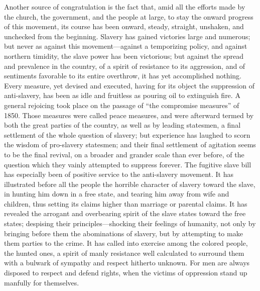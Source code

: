 Another source of congratulation is the fact that, amid all the efforts
made by the church, the government, and the people at large, to stay the
onward progress of this movement, its course has been onward, steady,
straight, unshaken, and unchecked from the beginning. Slavery has gained
victories large and numerous; but never as against this
movement---against a temporizing policy, and against northern timidity,
the slave power has been victorious; but against the spread and
prevalence in the country, of a spirit of resistance to its aggression,
and of sentiments favorable to its entire overthrow, it has yet
accomplished nothing. Every measure, yet devised and executed, having
for its object the suppression of anti-slavery, has been as idle and
fruitless as pouring oil to extinguish fire. A general rejoicing took
place on the passage of ``the compromise measures'' of 1850. Those
measures were called peace measures, and were afterward termed by both
the great parties of the country, as well as by leading statesmen, a
final settlement of the whole question of slavery; but experience has
laughed to scorn the wisdom of pro-slavery statesmen; and their final
settlement of agitation seems to be the final revival, on a broader and
grander scale than ever before, of the question which they vainly
attempted to suppress forever. The fugitive slave bill has especially
been of positive service to the anti-slavery movement. It has
illustrated before all the people the horrible character of slavery
toward the slave, in hunting him down in a free state, and tearing him
away from wife and children, thus setting its claims higher than
marriage or parental claims. It has revealed the arrogant and
overbearing spirit of the slave states toward the free states; despising
their principles---shocking their feelings of humanity, not only by
bringing before them the abominations of slavery, but by attempting to
make them parties to the crime. It has called into exercise among the
colored people, the hunted ones, a spirit of manly resistance well
calculated to surround {\protect\hypertarget{464}{}{}}them with a
bulwark of sympathy and respect hitherto unknown. For men are always
disposed to respect and defend rights, when the victims of oppression
stand up manfully for themselves.

